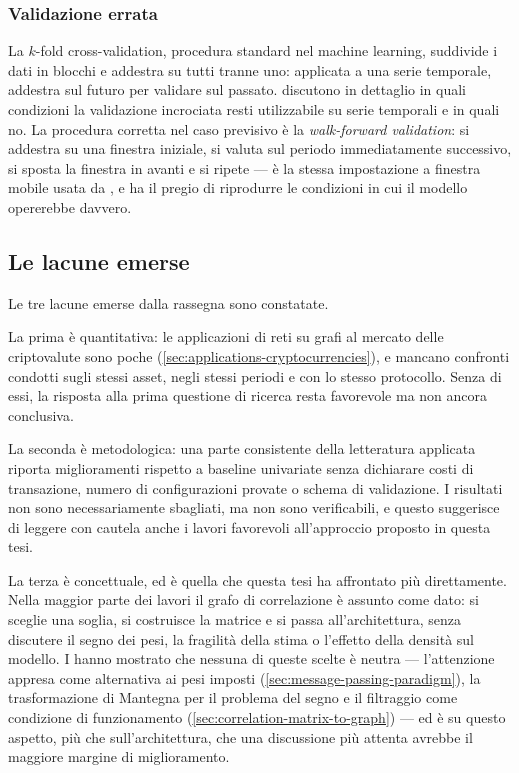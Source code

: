 \subsubsection{Validazione errata}
La $k$-fold cross-validation, procedura standard nel machine learning, suddivide i dati in blocchi e addestra su tutti tranne uno: applicata a una serie temporale, addestra sul futuro per validare sul passato. \Textcite{bergmeir2012use} discutono in dettaglio in quali condizioni la validazione incrociata resti utilizzabile su serie temporali e in quali no. La procedura corretta nel caso previsivo è la \emph{walk-forward validation}: si addestra su una finestra iniziale, si valuta sul periodo immediatamente successivo, si sposta la finestra in avanti e si ripete — è la stessa impostazione a finestra mobile usata da \textcite{matsunaga2019exploring}, e ha il pregio di riprodurre le condizioni in cui il modello opererebbe davvero.

\subsection{Le lacune emerse}

Le tre lacune emerse dalla rassegna sono constatate.

La prima è quantitativa: le applicazioni di reti su grafi al mercato delle criptovalute sono poche (\cref{sec:applications-cryptocurrencies}), e mancano confronti condotti sugli stessi asset, negli stessi periodi e con lo stesso protocollo. Senza di essi, la risposta alla prima questione di ricerca resta favorevole ma non ancora conclusiva.

La seconda è metodologica: una parte consistente della letteratura applicata riporta miglioramenti rispetto a baseline univariate senza dichiarare costi di transazione, numero di configurazioni provate o schema di validazione. I risultati non sono necessariamente sbagliati, ma non sono verificabili, e questo suggerisce di leggere con cautela anche i lavori favorevoli all'approccio proposto in questa tesi.

La terza è concettuale, ed è quella che questa tesi ha affrontato più direttamente. Nella maggior parte dei lavori il grafo di correlazione è assunto come dato: si sceglie una soglia, si costruisce la matrice e si passa all'architettura, senza discutere il segno dei pesi, la fragilità della stima o l'effetto della densità sul modello. I  hanno mostrato che nessuna di queste scelte è neutra — l'attenzione appresa come alternativa ai pesi imposti (\cref{sec:message-passing-paradigm}), la trasformazione di Mantegna per il problema del segno e il filtraggio come condizione di funzionamento (\cref{sec:correlation-matrix-to-graph}) — ed è su questo aspetto, più che sull'architettura, che una discussione più attenta avrebbe il maggiore margine di miglioramento.
